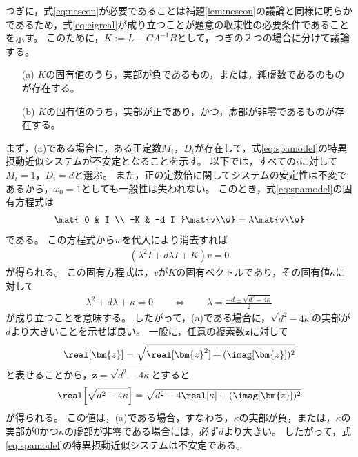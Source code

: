 \documentclass[tombow,dvipdfmx]{corona-a5}
\begin{document}
\begin{証明}
つぎに，式\ref{eq:nescon}が必要であることは補題\ref{lem:nescon}の議論と同様に明らかであるため，式\ref{eq:eigreal}が成り立つことが題意の収束性の必要条件であることを示す。
このために，$K:=L-CA^{-1}B$として，つぎの２つの場合に分けて議論する。
\begin{itemize}
\item[(a)] $K$の固有値のうち，実部が負であるもの，または，純虚数であるのものが存在する。
\item[(b)] $K$の固有値のうち，実部が正であり，かつ，虚部が非零であるものが存在する。
\end{itemize}
まず，(a)である場合に，ある正定数$M_i$，$D_i$が存在して，式\ref{eq:spamodel}の特異摂動近似システムが不安定となることを示す。
以下では，すべての$i$に対して$M_i=1$，$D_i=d$と選ぶ。
また，正の定数倍に関してシステムの安定性は不変であるから，$\omega_0 =1$としても一般性は失われない。
このとき，式\ref{eq:spamodel}の固有方程式は
\begin{align*}
\mat{
0 & I \\
-K & -d I
}
\mat{v\\w}
=
\lambda \mat{v\\w}
\end{align*}
である。
この方程式から$w$を代入により消去すれば
\begin{align*}
\left(\lambda^2 I +d \lambda I + K
\right) v =0
\end{align*}
が得られる。
この固有方程式は，$v$が$K$の固有ベクトルであり，その固有値$\kappa$に対して
\begin{align*}
\lambda^2 + d\lambda +\kappa =0
\qquad
\Longleftrightarrow
\qquad
\lambda = \frac{-d \pm \sqrt{d^2-4\kappa} }{2}
\end{align*}
が成り立つことを意味する。
したがって，(a)である場合に，$\sqrt{d^2 - 4\kappa }$の実部が$d$より大きいことを示せば良い。
一般に，任意の複素数$\bm{z}$に対して
\begin{align*}
\real[\bm{z}] = \sqrt{ \real[\bm{z}^2 ] + (\imag[\bm{z}])^2 }
\end{align*}
と表せることから，$\bm{z} = \sqrt{d^2 - 4\kappa }$とすると
\begin{align*}
\real \Bigl[
\sqrt{d^2 - 4\kappa }
\Bigr]
=\sqrt{
d^2 - 4 \real[\kappa]
+
(\imag[ \bm{z} ])^2
}
\end{align*}
が得られる。
この値は，(a)である場合，すなわち，$\kappa$の実部が負，または，$\kappa$の実部が0かつ$\kappa$の虚部が非零である場合には，必ず$d$より大きい。
したがって，式\ref{eq:spamodel}の特異摂動近似システムは不安定である。


\end{証明}
\end{document}
